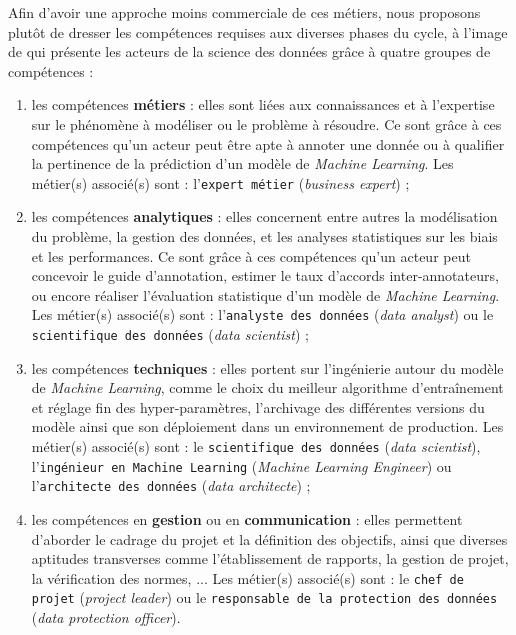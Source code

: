 		Afin d'avoir une approche moins commerciale de ces métiers, nous proposons plutôt de dresser les compétences requises aux diverses phases du cycle, à l'image de \cite{radovilsky-etal:2018:skills-requirements-business} qui présente les acteurs de la science des données grâce à quatre groupes de compétences :
		\begin{enumerate}
			\item les compétences \textbf{métiers} : elles sont liées aux connaissances et à l'expertise sur le phénomène à modéliser ou le problème à résoudre.
			Ce sont grâce à ces compétences qu'un acteur peut être apte à annoter une donnée ou à qualifier la pertinence de la prédiction d'un modèle de \textit{Machine Learning}.
			Les métier(s) associé(s) sont : l'\texttt{expert métier} (\textit{business expert}) ;
			\item les compétences \textbf{analytiques} : elles concernent entre autres la modélisation du problème, la gestion des données, et les analyses statistiques sur les biais et les performances.
			Ce sont grâce à ces compétences qu'un acteur peut concevoir le guide d'annotation, estimer le taux d'accords inter-annotateurs, ou encore réaliser l'évaluation statistique d'un modèle de \textit{Machine Learning}.
			Les métier(s) associé(s) sont : l'\texttt{analyste des données} (\textit{data analyst}) ou le \texttt{scientifique des données} (\textit{data scientist}) ;
			\item les compétences \textbf{techniques} : elles portent sur l'ingénierie autour du modèle de \textit{Machine Learning}, comme le choix du meilleur algorithme d'entraînement et réglage fin des hyper-paramètres, l'archivage des différentes versions du modèle ainsi que son déploiement dans un environnement de production.
			Les métier(s) associé(s) sont : le \texttt{scientifique des données} (\textit{data scientist}), l'\texttt{ingénieur en Machine Learning} (\textit{Machine Learning Engineer}) ou l'\texttt{architecte des données} (\textit{data architecte}) ;
			\item les compétences en \textbf{gestion} ou en \textbf{communication} : elles permettent d'aborder le cadrage du projet et la définition des objectifs, ainsi que diverses aptitudes transverses comme l'établissement de rapports, la gestion de projet, la vérification des normes, ...
			Les métier(s) associé(s) sont : le \texttt{chef de projet} (\textit{project leader}) ou le \texttt{responsable de la protection des données} (\textit{data protection officer}).
		\end{enumerate}
